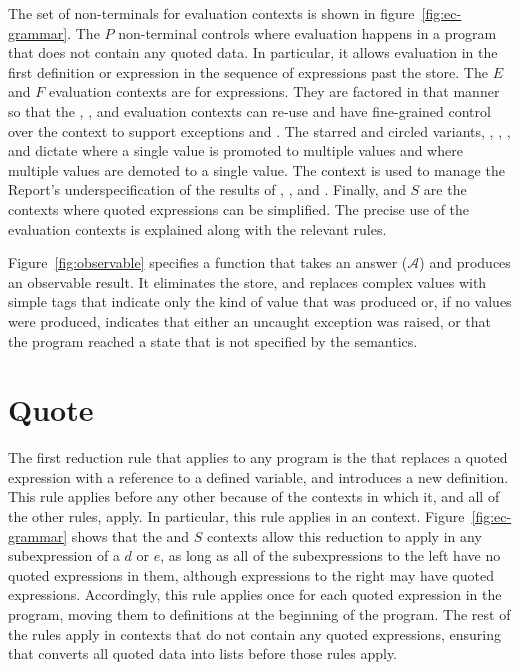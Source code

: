 The set of non-terminals for evaluation contexts is shown in
figure~\ref{fig:ec-grammar}. The $P$ non-terminal controls where
evaluation happens in a program that does not contain any quoted data.
In particular, it allows evaluation in the first definition or
expression in the sequence of expressions past the store. The $E$ and
$F$ evaluation contexts are for expressions.  They are factored in
that manner so that the , , and  evaluation contexts can
re-use  and have fine-grained control over the context to support
exceptions and . The starred and circled variants,
\Estar{}, \Eo, \Fstar, and \Fo{} dictate where a single value is
promoted to multiple values and where multiple values are demoted to a
single value. The  context is used to manage the Report's underspecification of the results of , , and . Finally,  and $S$ are the contexts where quoted
expressions can be simplified. The precise use of the evaluation
contexts is explained along with the relevant rules.

Figure~\ref{fig:observable} specifies a function that takes an answer ($\mathcal{A}$) and produces an observable result. It eliminates the store, and replaces complex values with simple tags that indicate only the kind of value that was produced or, if no values were produced, indicates that either an uncaught exception was raised, or that the program reached a state that is not specified by the semantics.

\section{Quote}\label{sec:semantics:quote}

The first reduction rule that applies to any program is the
 that replaces a quoted expression with a reference
to a defined variable, and introduces a new definition. This rule
applies before any other because of the contexts in which it, and all
of the other rules, apply. In particular, this rule applies in an
 context. Figure~\ref{fig:ec-grammar} shows that the
 and $S$ contexts allow this reduction to apply in
any subexpression of a $d$ or $e$, as long as all of the
subexpressions to the left have no quoted expressions in them,
although expressions to the right may have quoted expressions.
Accordingly, this rule applies once for each quoted expression in the
program, moving them to definitions at the beginning of the program.
The rest of the rules apply in contexts that do not contain any quoted
expressions, ensuring that  converts all quoted data
into lists before those rules apply.

